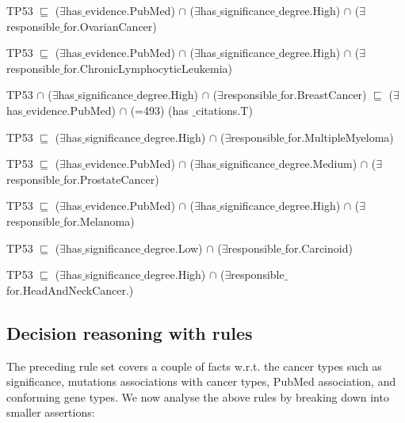 \begin{itemize}[noitemsep]
{    \item TP53 $ \sqsubseteq  $ ($\exists$has$ {\_}$evidence.PubMed) $  \cap $ ($\exists$has$ {\_}$significance$ {\_}$degree.High) $  \cap $ ($\exists$responsible$ {\_}$for.OvarianCancer)
    \item TP53 $ \sqsubseteq  $ ($\exists$has$ {\_}$evidence.PubMed) $  \cap $ ($\exists$has$ {\_}$significance$ {\_}$degree.High) $  \cap $ ($\exists$responsible$ {\_}$for.ChronicLymphocyticLeukemia)
    \item TP53 $  \cap $ ($\exists$has$ {\_}$significance$ {\_}$degree.High) $  \cap $ ($\exists$responsible$ {\_}$for.BreastCancer) $ \sqsubseteq  $ ($\exists$has$ {\_}$evidence.PubMed) $\cap$ (=493) (has ${\_}$citations.T)
    \item TP53 $ \sqsubseteq  $ ($\exists$has$ {\_}$significance$ {\_}$degree.High) $  \cap $ ($\exists$responsible$ {\_}$for.MultipleMyeloma)
    \item TP53 $ \sqsubseteq  $ ($\exists$has$ {\_}$evidence.PubMed) $  \cap $ ($\exists$has$ {\_}$significance$ {\_}$degree.Medium) $  \cap $ ($\exists$responsible$ {\_}$for.ProstateCancer)
    \item TP53 $ \sqsubseteq  $ ($\exists$has$ {\_}$evidence.PubMed) $  \cap $ ($\exists$has$ {\_}$significance$ {\_}$degree.High) $  \cap $ ($\exists$responsible$ {\_}$for.Melanoma)
    \item TP53 $ \sqsubseteq  $ ($\exists$has$ {\_}$significance$ {\_}$degree.Low) $  \cap $ ($\exists$responsible$ {\_}$for.Carcinoid)
    \item TP53 $ \sqsubseteq  $ ($\exists$has$ {\_}$significance$ {\_}$degree.High) $  \cap $ ($\exists$responsible$ {\_}$for.HeadAndNeckCancer.)}
\end{itemize}

\subsection{Decision reasoning with rules}
The preceding rule set covers a couple of facts w.r.t. the cancer types such as significance, mutations associations with cancer types, PubMed association, and conforming gene types. We now analyse the above rules by breaking down into smaller assertions: 
\vspace{-2mm}

